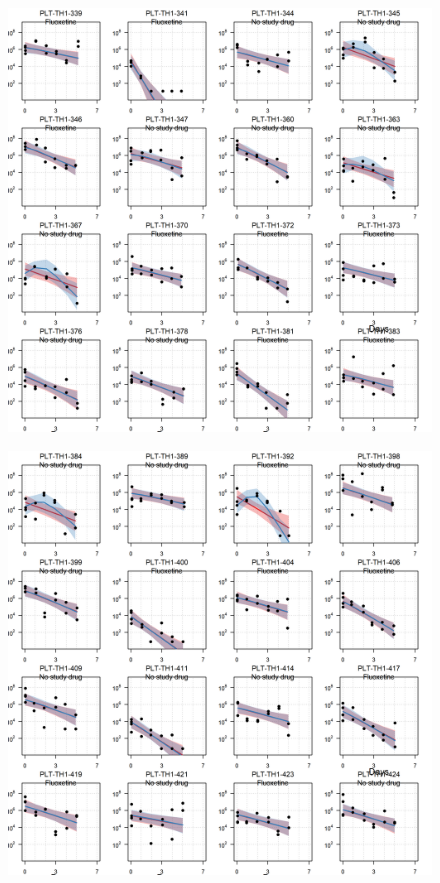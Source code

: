 \documentclass[
  letterpaper,
  DIV=11,
  numbers=noendperiod]{scrartcl}
\begin{document}
\begin{figure}[H]

{\centering \includegraphics{Fluoxetine_analysis_files/figure-pdf/individ_data-7.png}

}

\end{figure}

\begin{figure}[H]

{\centering \includegraphics{Fluoxetine_analysis_files/figure-pdf/individ_data-8.png}

}

\end{figure}
\end{document}

